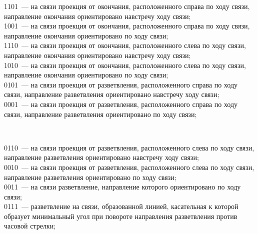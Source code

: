 \begin{multicols}{2}
\smallskip

1101~--- на связи проекция от окончания, расположенного справа по ходу связи, направление
окончания ориентировано навстречу ходу связи;\\[-9pt]

1001~--- на связи проекция от окончания, расположенного справа по ходу связи, направление
окончания ориентировано по ходу связи;\\[-9pt]

1110~--- на связи проекция от окончания, расположенного слева по ходу связи, направление
окончания ориентировано навстречу ходу связи;\\[-9pt]


1010~--- на связи проекция от окончания, расположенного слева по ходу связи, направление
окончания ориентировано по ходу связи;\\[-9pt]


0101~--- на связи проекция от разветвления, расположенного справа по ходу связи, направление
разветвления ориентировано навстречу ходу связи;\\[-9pt]


0001~--- на связи проекция от разветвления, расположенного справа по ходу связи, направление
разветвления ориентировано по ходу связи;\\[-9pt]

\begin{figure*} %
\vspace*{1pt}
\begin{center}
\mbox{%
\epsfxsize=153.389mm
}
\end{center}
\vspace*{-9pt}
\end{figure*}

0110~--- на связи проекция от разветвления, расположенного слева по ходу связи, направление
разветвления ориентировано навстречу ходу связи;\\[-9pt]

0010~--- на связи проекция от разветвления, расположенного слева по ходу связи, направление
разветвления ориентировано по ходу связи;\\[-9pt]

0011~--- на связи разветвление, направление которого ориентировано по ходу связи;\\[-9pt]

0111~--- разветвление на связи, образованной линией, касательная к которой образует
минимальный угол при повороте направления разветвления против часовой стрелки;\\[-9pt]


\end{multicols}

